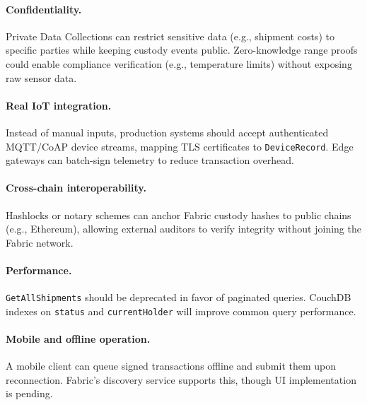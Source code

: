 \documentclass[conference]{IEEEtran}
\begin{document}
\paragraph{Confidentiality.}
Private Data Collections can restrict sensitive data (e.g., shipment costs) to specific parties while keeping custody events public. Zero-knowledge range proofs could enable compliance verification (e.g., temperature limits) without exposing raw sensor data.

\paragraph{Real IoT integration.}
Instead of manual inputs, production systems should accept authenticated MQTT/CoAP device streams, mapping TLS certificates to \texttt{DeviceRecord}. Edge gateways can batch-sign telemetry to reduce transaction overhead.

\paragraph{Cross-chain interoperability.}
Hashlocks or notary schemes can anchor Fabric custody hashes to public chains (e.g., Ethereum), allowing external auditors to verify integrity without joining the Fabric network.

\paragraph{Performance.}
\texttt{GetAllShipments} should be deprecated in favor of paginated queries. CouchDB indexes on \texttt{status} and \texttt{currentHolder} will improve common query performance.

\paragraph{Mobile and offline operation.}
A mobile client can queue signed transactions offline and submit them upon reconnection. Fabric’s discovery service supports this, though UI implementation is pending.
\end{document}
